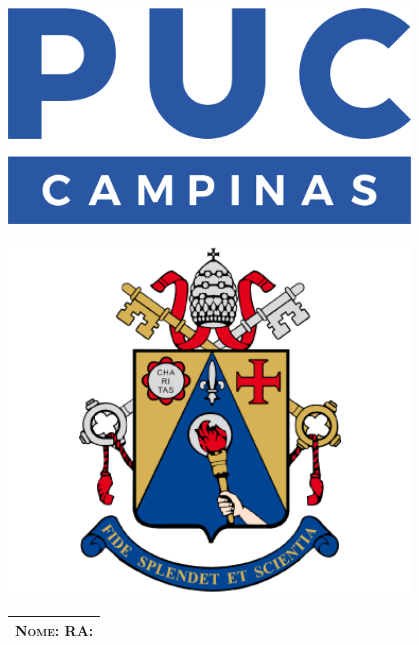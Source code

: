 \pagestyle{fancy}

\begin{center}
	\begin{minipage}[C]{0.15\textwidth}
		\begin{center}
			\includegraphics[width=0.8\textwidth]{imgs/logo-college.png}
		\end{center}
	\end{minipage}
	\begin{minipage}[C]{0.5\textwidth}
		\begin{center}
			\textsc{\collegename}
			
			\textsc{\schoolname}
			
			\textsc{\facultyname}
		\end{center}
	\end{minipage}
	\begin{minipage}[C]{0.15\textwidth}
		\begin{center}
			\includegraphics[width=0.8\textwidth]{imgs/badge-college.png}
		\end{center}
	\end{minipage}
\end{center}

\begin{center}
	\begin{tabular}{c}
		\noindent\textsc{Nome:} \hspace{10cm} \textsc{RA:} \hspace{4cm} \\ \hline 
	\end{tabular}
\end{center}

\begin{center}
	{\huge \textbf{\doctitle}}
	
	\fdocsubtitle
	
	\fdocduedate
\end{center}